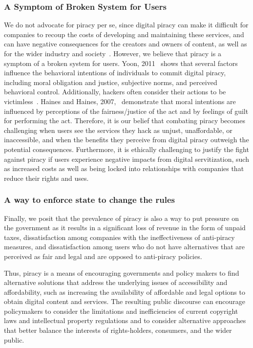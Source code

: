 \documentclass[sigplan,screen,nonacm]{acmart}
\begin{document}
\subsubsection{A Symptom of Broken System for Users}

We do not advocate for piracy per se, since digital piracy can make it difficult for companies to recoup the costs of developing and maintaining these services, and can have negative consequences for the creators and owners of content, as well as for the wider industry and society~\cite{hashim2018central}. However, we believe that piracy is a symptom of a broken system for users. Yoon, 2011~\cite{yoon2011theory} shows that several factors influence the behavioral intentions of individuals to commit digital piracy, including moral obligation and justice, subjective norms, and perceived behavioral control. Additionally, hackers often consider their actions to be victimless~\cite{hashim2018central}. Haines and Haines, 2007,~\cite{haines2007fairness} demonstrate that moral intentions are influenced by perceptions of the fairness/justice of the act and by feelings of guilt for performing the act. Therefore, it is our belief that combating piracy becomes challenging when users see the services they hack as unjust, unaffordable, or inaccessible, and when the benefits they perceive from digital piracy outweigh the potential consequences. Furthermore, it is ethically challenging to justify the fight against piracy if users experience negative impacts from digital servitization, such as increased costs as well as being locked into relationships with companies that reduce their rights and uses.

\subsubsection{A way to enforce state to change the rules}
Finally, we posit that the prevalence of piracy is also a way to put pressure on the government as it results in a significant loss of revenue in the form of unpaid taxes, dissatisfaction among companies with the ineffectiveness of anti-piracy measures, and dissatisfaction among users who do not have alternatives that are perceived as fair and legal and are opposed to anti-piracy policies.

Thus, piracy is a means of encouraging governments and policy makers to find alternative solutions that address the underlying issues of accessibility and affordability, such as increasing the availability of affordable and legal options to obtain digital content and services. The resulting public discourse can encourage policymakers to consider the limitations and inefficiencies of current copyright laws and intellectual property regulations and to consider alternative approaches that better balance the interests of rights-holders, consumers, and the wider public.
\end{document}
